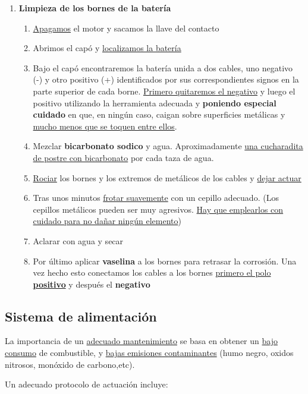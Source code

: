 \documentclass[a4paper,12pt,oneside]{book}
\begin{document}
\begin{enumerate}
\item \textbf{Limpieza de los bornes de la batería}
\label{sec:orgbb1d3cb}
\begin{enumerate}
\item \uline{Apagamos} el motor y sacamos la llave del contacto
\item Abrimos el capó y \uline{localizamos la batería}
\item Bajo el capó encontraremos la batería unida a dos cables, uno negativo (-) y
otro positivo (+) identificados por sus correspondientes signos en la  parte
superior de cada borne. \uline{Primero quitaremos el negativo} y luego el  positivo
utilizando la herramienta adecuada y \textbf{poniendo especial cuidado} en que, en
ningún caso, caigan sobre superficies metálicas y \uline{mucho menos que se toquen
entre ellos}.
\item Mezclar \textbf{bicarbonato sodico} y agua. Aproximadamente \uline{una cucharadita de 
postre con bicarbonato} por cada taza de agua.
\item \uline{Rociar} los bornes y los extremos de metálicos de los cables y \uline{dejar
actuar}
\item Tras unos minutos \uline{frotar suavemente} con un cepillo adecuado. (Los cepillos
metálicos pueden ser muy agresivos. \uline{Hay que emplearlos con cuidado para no 
dañar ningún elemento})
\item Aclarar con agua y secar
\item Por último aplicar \textbf{vaselina} a los bornes para retrasar la corrosión. Una
vez hecho esto conectamos los cables a los bornes \uline{primero el polo \textbf{positivo}}
y después el \textbf{negativo}
\end{enumerate}
\end{enumerate}

\subsection{Sistema de alimentación}
\label{sec:org4e06d06}

La importancia de un \uline{adecuado mantenimiento} se basa en obtener un \uline{bajo consumo}
de combustible, y \uline{bajas emisiones contaminantes} (humo negro, oxidos nitrosos,
monóxido de carbono,etc).

Un adecuado protocolo de actuación incluye:
\end{document}
